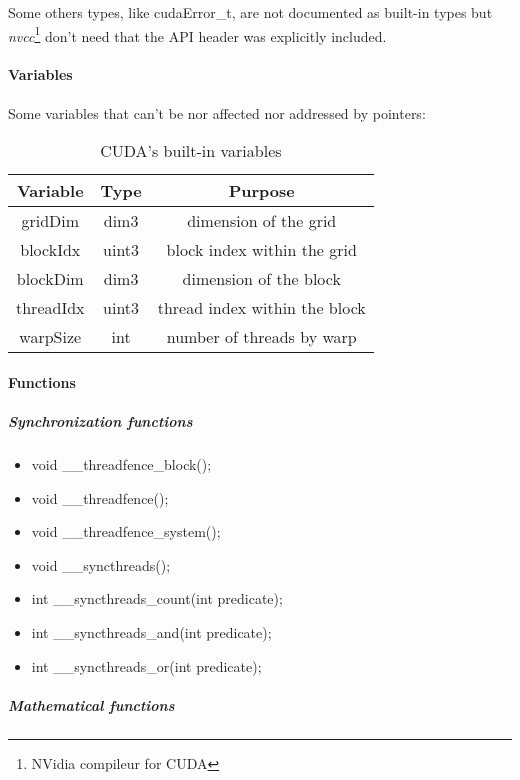 Some others types, like cudaError\_t, are not documented as built-in types but \emph{nvcc}\footnote{NVidia compileur for CUDA} don't need that the 
API header was explicitly included.

				\paragraph{Variables}

Some variables that can't be nor affected nor addressed by pointers:
\begin{table}[!h]
	\caption{CUDA's built-in variables}
	\center
	\begin{tabular}{|c|c|c|} \hline
	Variable & Type & Purpose \\\hline\hline
	gridDim   & dim3  & dimension of the grid \\\hline
	blockIdx  & uint3 & block index within the grid \\\hline
	blockDim  & dim3  & dimension of the block \\\hline
	threadIdx & uint3 & thread index within the block \\\hline
	warpSize  & int   & number of threads by warp \\\hline
	\end{tabular}
	\label{heterogeneous:tabCudaVariable}
\end{table}

				\paragraph{Functions}

					\subparagraph{Synchronization functions}
					
\begin{itemize}
	\item void \_\_threadfence\_block();
	\item void \_\_threadfence();
	\item void \_\_threadfence\_system();
	\item void \_\_syncthreads();
	\item int \_\_syncthreads\_count(int predicate);
	\item int \_\_syncthreads\_and(int predicate);
	\item int \_\_syncthreads\_or(int predicate);
\end{itemize}

					\subparagraph{Mathematical functions}
					
